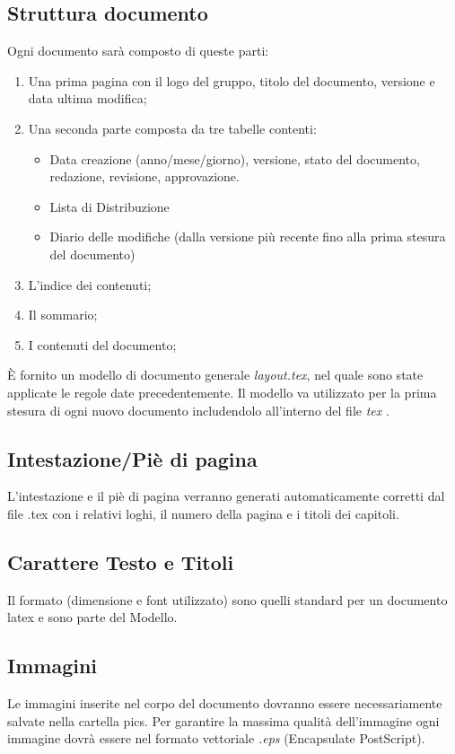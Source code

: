 \subsection{Struttura documento}
Ogni documento sar\`a composto di queste parti:
\begin{enumerate}
\item Una prima pagina con il logo del gruppo, titolo del documento, versione e data ultima modifica;
\item Una seconda parte composta da tre tabelle contenti:
	{\begin{itemize}
	\item Data creazione (anno/mese/giorno), versione, stato del documento, redazione, revisione, approvazione.
	\item Lista di Distribuzione
	\item Diario delle modifiche (dalla versione pi\`u recente fino alla prima stesura del documento)
	\end{itemize}}
\item L'indice dei contenuti;
\item Il sommario;
\item I contenuti del documento;
\end{enumerate}
\`E fornito un modello di documento generale \textit{layout.tex}, nel quale sono state applicate le regole date precedentemente. Il modello va utilizzato  per la prima stesura di ogni nuovo documento includendolo all'interno del file \textit{tex} .
\subsection{Intestazione/Pi\`e di pagina}
L'intestazione e il pi\`e di pagina verranno generati automaticamente corretti dal file .tex con i relativi loghi, il numero della pagina e i titoli dei capitoli.
\subsection{Carattere Testo e Titoli}
Il formato (dimensione e font utilizzato) sono quelli standard per un documento latex e sono parte del Modello.
\subsection{Immagini}
Le immagini inserite nel corpo del documento dovranno essere necessariamente salvate nella cartella pics. Per garantire la massima qualit\`a dell'immagine ogni immagine dovr\`a essere nel formato vettoriale \textit{.eps} (Encapsulate PostScript).
